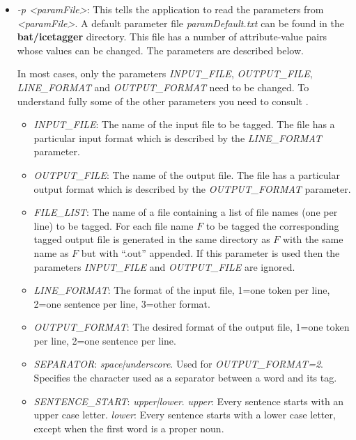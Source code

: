 \documentclass[11pt]{article}
\begin{document}
\begin{itemize}
\item \emph{-p <paramFile>}: This tells the application to read the parameters from \emph{<paramFile>}.
A default parameter file \emph{paramDefault.txt} can be found in the \textbf{bat/icetagger} directory.
This file has a number of attribute-value pairs whose values can be changed.
The parameters are described below.

In most cases, only the parameters \emph{INPUT\_FILE}, \emph{OUTPUT\_FILE}, \emph{LINE\_FORMAT} and \emph{OUTPUT\_FORMAT} need to be changed.
To understand fully some of the other parameters you need to consult \citep{lof08}.
\begin{itemize}
\item \emph{INPUT\_FILE}: The name of the input file to be tagged. The file has a particular input format which is described by the \emph{LINE\_FORMAT} parameter.
\item \emph{OUTPUT\_FILE}: The name of the output file. The file has a particular output format which is described by the \emph{OUTPUT\_FORMAT} parameter. 
\item \emph{FILE\_LIST}: The name of a file containing a list of file names (one per line) to be tagged. For each file name $F$ to be tagged the corresponding tagged output file is generated in the same directory as $F$ with the same name as $F$ but with ``.out'' appended. If this parameter is used then the parameters \emph{INPUT\_FILE} and \emph{OUTPUT\_FILE} are ignored. 
\item \emph{LINE\_FORMAT}: The format of the input file, 1=one token per line, 2=one sentence per line, 3=other format.
\item \emph{OUTPUT\_FORMAT}: The desired format of the output file, 1=one token per line, 2=one sentence per line.
\item \emph{SEPARATOR}: \emph{space|underscore}. Used for \emph{OUTPUT\_FORMAT=2}. Specifies the character used as a separator between a word and its tag.
\item \emph{SENTENCE\_START}: \emph{upper|lower}. \emph{upper}: Every sentence starts with an upper case letter. \emph{lower}: Every sentence starts with a lower case letter, except when the first word is a proper noun.

\end{itemize}
\end{itemize}
\end{document}
